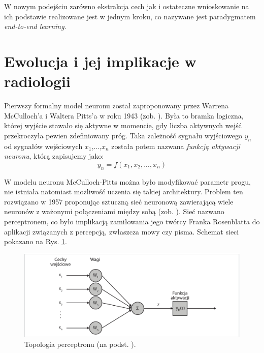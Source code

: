 W nowym podejściu zarówno ekstrakcja cech jak i ostateczne wnioskowanie \linebreak na ich podstawie realizowane jest w jednym kroku, co nazywane jest paradygmatem \textit{end-to-end learning}. 

\section{Ewolucja i jej implikacje w radiologii}
\label{seq:DL_intro}
Pierwszy formalny model neuronu został zaproponowany przez Warrena McCulloch'a i Waltera Pitts'a w roku 1943 (zob. \cite{McCulloch1943}). Była to bramka logiczna, której wyjście stawało się aktywne w momencie, gdy liczba aktywnych wejść przekroczyła pewien zdefiniowany próg. Taka zależność sygnału wyjściowego $y_n$ od sygnałów wejściowych $x_1$,...,$x_n$ została potem nazwana \textit{funkcją aktywacji neuronu}, którą zapisujemy jako:
\begin{equation}
\label{eqActFunc}
y_n=f\left(x_1, x_2,..., x_n\right)
\end{equation}

W modelu neuronu McCulloch-Pitts można było modyfikować parametr progu, nie istniała natomiast możliwość uczenia się takiej architektury. Problem ten rozwiązano w 1957 proponując sztuczną sieć neuronową zawierającą wiele neuronów \linebreak z ważonymi połączeniami między sobą (zob. \cite{Rosenblatt1957}). Sieć nazwano perceptronem, \linebreak co było implikacją zamiłowania jego twórcy Franka Rosenblatta do aplikacji związanych z percepcją, zwłaszcza mowy czy pisma. Schemat sieci pokazano na Rys. \ref{Perceptron}.
\begin{figure}[h!]
	\centering
	\includegraphics[width=1\textwidth]{figures/perceptron.jpg}
	\caption{Topologia perceptronu (na podst. \cite{Rosenblatt1957}).}
	\label{Perceptron}
\end{figure}

